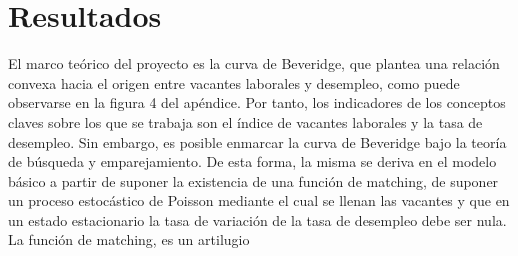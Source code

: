 \documentclass[msc,oneside,a4paper]{udelar}\usepackage[]{graphicx}\usepackage[]{color}
\begin{document}
\chapter{Resultados}

El marco teórico del proyecto es la curva de Beveridge, que plantea una relación convexa hacia el origen entre vacantes laborales y desempleo, como puede observarse en la figura 4 del apéndice. Por tanto, los indicadores de los conceptos claves sobre los que se trabaja son el índice de vacantes laborales y la tasa de desempleo. Sin embargo, es posible enmarcar la curva de Beveridge bajo la teoría de búsqueda y emparejamiento. De esta forma, la misma se deriva en el modelo básico \cite{Pissarides2000} a partir de suponer la existencia de una función de matching, de suponer un proceso estocástico de Poisson mediante el cual se llenan las vacantes y que en un estado estacionario la tasa de variación de la tasa de desempleo debe ser nula. La función de matching, es un artilugio 
\end{document}
